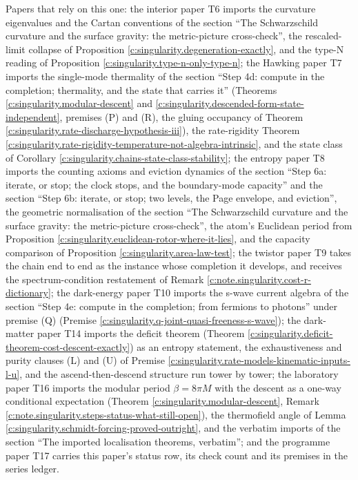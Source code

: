 \documentclass[11pt]{article}
\theoremstyle{definition}
\theoremstyle{plain}
\begin{document}
Papers that rely on this one: the interior paper T6 \cite{ButlerT6} imports the curvature eigenvalues and the Cartan conventions of the section ``The Schwarzschild curvature and the surface gravity: the metric-picture cross-check'', the rescaled-limit collapse of Proposition \ref{c:singularity.degeneration-exactly}, and the type-N reading of Proposition \ref{c:singularity.type-n-only-type-n}; the Hawking paper T7 \cite{ButlerT7} imports the single-mode thermality of the section ``Step 4d: compute in the completion; thermality, and the state that carries it'' (Theorems \ref{c:singularity.modular-descent} and \ref{c:singularity.descended-form-state-independent}, premises (P) and (R), the gluing occupancy of Theorem \ref{c:singularity.rate-discharge-hypothesis-iii}), the rate-rigidity Theorem \ref{c:singularity.rate-rigidity-temperature-not-algebra-intrinsic}, and the state class of Corollary \ref{c:singularity.chains-state-class-stability}; the entropy paper T8 \cite{ButlerT8} imports the counting axioms and eviction dynamics of the section ``Step 6a: iterate, or stop; the clock stops, and the boundary-mode capacity'' and the section ``Step 6b: iterate, or stop; two levels, the Page envelope, and eviction'', the geometric normalisation of the section ``The Schwarzschild curvature and the surface gravity: the metric-picture cross-check'', the atom's Euclidean period from Proposition \ref{c:singularity.euclidean-rotor-where-it-lies}, and the capacity comparison of Proposition \ref{c:singularity.area-law-test}; the twistor paper T9 \cite{ButlerT9} takes the chain end to end as the instance whose completion it develops, and receives the spectrum-condition restatement of Remark \ref{c:note.singularity.cost-r-dictionary}; the dark-energy paper T10 \cite{ButlerT10} imports the s-wave current algebra of the section ``Step 4e: compute in the completion; from fermions to photons'' under premise (Q) (Premise \ref{c:singularity.q-joint-quasi-freeness-s-wave}); the dark-matter paper T14 \cite{ButlerT14} imports the deficit theorem (Theorem \ref{c:singularity.deficit-theorem-cost-descent-exactly}) as an entropy statement, the exhaustiveness and purity clauses (L) and (U) of Premise \ref{c:singularity.rate-models-kinematic-inputs-l-u}, and the ascend-then-descend structure run tower by tower; the laboratory paper T16 \cite{ButlerT16} imports the modular period $\beta = 8\pi M$ with the descent as a one-way conditional expectation (Theorem \ref{c:singularity.modular-descent}, Remark \ref{c:note.singularity.steps-status-what-still-open}), the thermofield angle of Lemma \ref{c:singularity.schmidt-forcing-proved-outright}, and the verbatim imports of the section ``The imported localisation theorems, verbatim''; and the programme paper T17 \cite{ButlerT17} carries this paper's status row, its check count and its premises in the series ledger.
\end{document}
